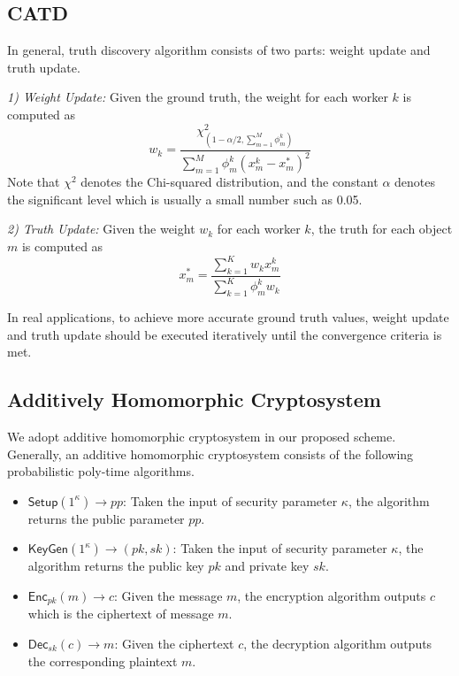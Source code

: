 \documentclass[conference]{IEEEtran}
\begin{document}

\subsection{CATD}
In general, truth discovery algorithm consists of two parts: weight update and truth update.

\textit{1) Weight Update:} Given the ground truth, the weight for each worker $k$ is computed as
\begin{equation}
w_k = \frac{\chi^2_{(1-\alpha/2,\sum_{m=1}^M \phi_m^k)}}{\sum_{m=1}^M \phi_m^k(x_m^k - x_m^*)^2}
\end{equation}
Note that $\chi^2$ denotes the Chi-squared distribution, and the constant $\alpha$ denotes the significant level which is usually a small number such as 0.05.

\textit{2) Truth Update:} Given the weight $w_k$ for each worker $k$, the truth for each object $m$ is computed as
\begin{equation}
x_m^* = \frac{\sum_{k=1}^K w_k x_m^k}{\sum_{k=1}^K \phi_m^k w_k }
\end{equation}

In real applications, to achieve more accurate ground truth values, weight update and truth update should be executed iteratively until the convergence criteria is met.

\subsection{Additively Homomorphic Cryptosystem}\label{sec4-b}

We adopt additive homomorphic cryptosystem in our proposed scheme.
Generally, an additive homomorphic cryptosystem consists of the following probabilistic poly-time algorithms.

\begin{itemize}
  \item $\mathsf{Setup}(1^\kappa)\to pp$: Taken the input of security parameter $\kappa$, the algorithm returns the public parameter $pp$.
  \item $\mathsf{KeyGen}(1^\kappa)\to (pk, sk)$: Taken the input of security parameter $\kappa$, the algorithm returns the public key $pk$ and private key $sk$.
  \item $\mathsf{Enc}_{pk}(m)\to c$: Given the message $m$, the encryption algorithm outputs $c$ which is the ciphertext of message $m$.
  \item $\mathsf{Dec}_{sk}(c)\to m$: Given the ciphertext $c$, the decryption algorithm outputs the corresponding plaintext $m$.
\end{itemize}
\end{document}
